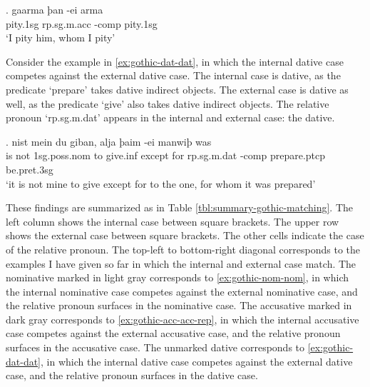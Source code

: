 \exg. gaarma þan -ei arma\\
 pity.1\ac{sg}\scsub{[acc]} \ac{rp}.\ac{sg}.\ac{m}.\ac{acc} -\ac{comp} pity.1\ac{sg}\scsub{[acc]}\\
 `I pity him, whom I pity' \label{ex:gothic-acc-acc-rep}

Consider the example in \ref{ex:gothic-dat-dat}, in which the internal dative case competes against the external dative case.
The internal case is dative, as the predicate  `prepare' takes dative indirect objects.
The external case is dative as well, as the predicate  `give' also takes dative indirect objects.
The relative pronoun  `\ac{rp}.\ac{sg}.\ac{m}.\ac{dat}' appears in the internal and external case: the dative.

\exg. nist mein du giban, alja þaim -ei manwiþ was\\
{is not} 1\ac{sg}.\ac{poss}.\ac{nom} to give.\ac{inf}\scsub{[dat]} {except for} \ac{rp}.\ac{sg}.\ac{m}.\ac{dat} -\ac{comp} prepare.\ac{ptcp} be.\ac{pret}.3\ac{sg}\scsub{[dat]}\\
`it is not mine to give except for to the one, for whom it was prepared'\label{ex:gothic-dat-dat}

These findings are summarized as in Table \ref{tbl:summary-gothic-matching}. The left column shows the internal case between square brackets. The upper row shows the external case between square brackets. The other cells indicate the case of the relative pronoun. The top-left to bottom-right diagonal corresponds to the examples I have given so far in which the internal and external case match. The nominative marked in light gray corresponds to \ref{ex:gothic-nom-nom}, in which the internal nominative case competes against the external nominative case, and the relative pronoun surfaces in the nominative case. The accusative marked in dark gray corresponds to \ref{ex:gothic-acc-acc-rep}, in which the internal accusative case competes against the external accusative case, and the relative pronoun surfaces in the accusative case.
The unmarked dative corresponds to \ref{ex:gothic-dat-dat}, in which the internal dative case competes against the external dative case, and the relative pronoun surfaces in the dative case.

